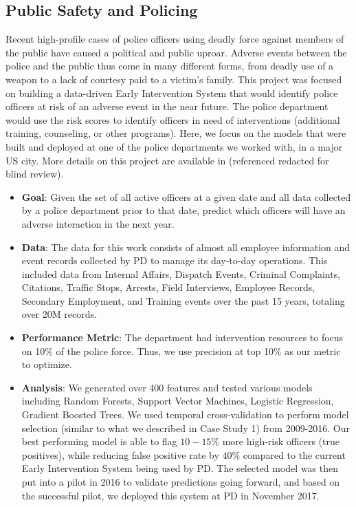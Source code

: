 \subsection{Public Safety and Policing}
Recent high-profile cases of police officers using deadly force against members of the public have caused a political and public uproar. Adverse events between the police and the public thus come in many different forms, from deadly use of a weapon to a lack of courtesy paid to
a victim’s family. This project was focused on building a data-driven Early Intervention System that would identify police officers at risk of an adverse event in the near future. The police department would use the risk scores to identify officers in need of interventions (additional training, counseling, or other programs). Here, we focus on the models that were built and deployed at one of the police departments we worked with, in a major US city. More details on this project are available in (referenced redacted for blind review).

\begin{itemize}
\item \textbf{Goal}:  Given the set of all active officers at a given date and all data collected by a police department prior to that date, predict which officers will have an adverse interaction in the next year.
\item \textbf{Data}: The data for this work consists of almost all employee information and event records collected by PD to manage its day-to-day operations. This included data from Internal Affairs, Dispatch Events, Criminal Complaints, Citations, Traffic Stops, Arrests, Field Interviews, Employee Records, Secondary Employment, and Training events over the past 15 years, totaling over 20M records.
\item \textbf{Performance Metric}: The department had intervention resources to focus on 10\% of the police force. Thus, we use precision at top 10\% as our metric to optimize.
\item \textbf{Analysis}: We generated over 400 features and tested various models including Random Forests, Support Vector Machines, Logistic Regression, Gradient Boosted Trees. We used temporal cross-validation to perform model selection (similar to what we described in Case Study 1) from 2009-2016. Our best performing model is able to flag $10-15\%$ more high-risk officers (true positives), while reducing false positive rate by  $40\%$ compared to the current Early Intervention System being used by PD. The selected model was then put into a pilot in 2016 to validate predictions going forward, and based on the successful pilot, we deployed this system at PD in November 2017.

\end{itemize}


